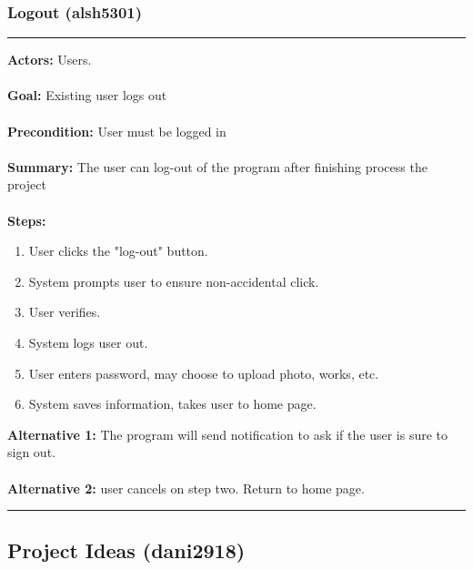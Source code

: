 \documentclass[11pt]{report}
\begin{document}
\subsubsection{Logout (alsh5301)}
\vspace{2pt}
\hrule
\vspace{8pt}
 \textbf{Actors:} Users. \\ \\
\textbf{Goal:} Existing user logs out \\ \\
\textbf{Precondition:} User must be logged in \\ \\
 \textbf{Summary:}  The user can log-out of the program after finishing process the project  \\ \\
 \textbf{Steps:} \begin{enumerate}
 \item User clicks the "log-out" button. 
 \item System prompts user to ensure non-accidental click. 
 \item User verifies. 
 \item System logs user out. 
 \item User enters password, may choose to upload photo, works, etc. 
 \item System saves information, takes user to home page.
 \end{enumerate}
  \textbf{Alternative 1:} The program will send notification to ask if the user is sure to sign out. \\ \\
  \textbf{Alternative 2:} user cancels on step two. Return to home page. \\
\vspace{8pt}
\hrule
\newpage

\subsection{Project Ideas (dani2918)}
\end{document}
